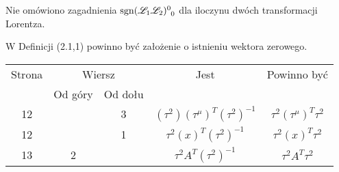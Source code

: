 \documentclass[a4paper,11pt]{article}
\begin{document}
\vspace{\spaceTwo}













\newpage


\vspace{0em}



\vspace{0em}


\noindent
{}

\vspace{\spaceFour}





\noindent
{} Nie omówiono zagadnienia
$\sgn\tensor{ ( \Lcal_{ 1 } \Lcal_{ 2 } ) }{^{ 0 }_{ 0 }}$ dla iloczynu dwóch
transformacji Lorentza.

\vspace{\spaceFour}





\noindent
{} W Definicji (2.1,1) powinno być założenie o istnieniu
wektora zerowego.







\begin{center}

  \begin{tabular}{|c|c|c|c|c|}
    \hline
    Strona & \multicolumn{2}{c|}{Wiersz} & Jest
                              & Powinno być \\ \cline{2-3}
    & Od góry & Od dołu & & \\
    \hline
    12 & &  3 & $( \tau^{ 2 } )( \tau^{ \mu } )^{ T }( \tau^{ 2 } )^{ -1 }$
           & $\tau^{ 2 } ( \tau^{ \mu } )^{ T } \tau^{ 2 }$ \\
    12 & & 1 & $\tau^{ 2 } ( x )^{ T }( \tau^{ 2 } )^{ -1 }$
           & $\tau^{ 2 } ( x )^{ T } \tau^{ 2 }$ \\ %
    13 & 2 & & $\tau^{ 2 } A^{ T }( \tau^{ 2 } )^{ -1 }$
           & $\tau^{ 2 } A^{ T } \tau^{ 2 }$ \\
    \hline
  \end{tabular}

\end{center}
\end{document}
